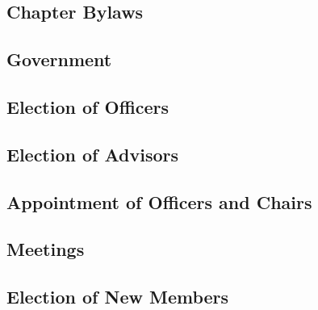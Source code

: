 \documentclass[bylaws,final,10pt,withoutoptional,withoutpreface]{../bylaws}
\begin{document}

\newcommand{\removed}[1]{\cbstart\removedfragile{#1}\cbend{}}
\newcommand{\removedfragile}[1]{{\color{red}{#1}}{}}
\newcommand{\added}[1]{\cbstart\addedfragile{#1}\cbend{}}
\newcommand{\addedfragile}[1]{{\color{green!50!black}{#1}}{}}
\newcommand{\changed}[2]{\added{#1}\removed{#2}}



\frontmatter
\maketitle
%

%
\tableofcontents\newpage
\mainmatter
\begin{optionalpart}
\part{Chapter Bylaws}
\end{optionalpart}

\chapter{Government}\label{sec:gov}



\chapter{Election of Officers}\label{sec:oficElec}


\chapter{Election of Advisors}\label{sec:advElec}




\chapter{Appointment of Officers and Chairs}\label{sec:appointmentofficers}


\chapter{Meetings}\label{sec:meetings}


\chapter{Election of New Members}\label{sec:newElec}

\end{document}

